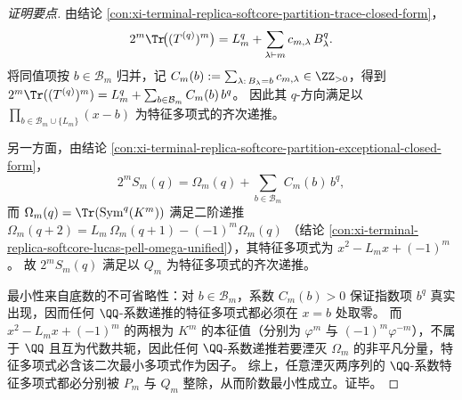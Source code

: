 \begin{proof}[证明要点]
由结论 \ref{con:xi-terminal-replica-softcore-partition-trace-closed-form}，
\[
2^m\Tr\!\bigl((T^{(q)})^m\bigr)=L_m^{q}+\sum_{\lambda\vdash m}c_{m,\lambda}\,B_\lambda^{q}.
\]
将同值项按 \(b\in\mathcal B_m\) 归并，记
\(
C_m(b):=\sum_{\lambda:\,B_\lambda=b}c_{m,\lambda}\in\ZZ_{>0}
\)，得到
\(
2^m\Tr((T^{(q)})^m)=L_m^q+\sum_{b\in\mathcal B_m}C_m(b)\,b^q
\)。
因此其 \(q\)-方向满足以 \(\prod_{b\in\mathcal B_m\cup\{L_m\}}(x-b)\) 为特征多项式的齐次递推。
\par
另一方面，由结论 \ref{con:xi-terminal-replica-softcore-partition-exceptional-closed-form}，
\[
2^mS_m(q)=\Omega_m(q)+\sum_{b\in\mathcal B_m}C_m(b)\,b^q,
\]
而 \(\Omega_m(q)=\Tr(\mathrm{Sym}^q(K^m))\) 满足二阶递推
\(
\Omega_m(q+2)=L_m\,\Omega_m(q+1)-(-1)^m\Omega_m(q)
\)
（结论 \ref{con:xi-terminal-replica-softcore-lucas-pell-omega-unified}），其特征多项式为 \(x^2-L_m x+(-1)^m\)。
故 \(2^mS_m(q)\) 满足以 \(Q_m\) 为特征多项式的齐次递推。
\par
最小性来自底数的不可省略性：对 \(b\in\mathcal B_m\)，系数 \(C_m(b)>0\) 保证指数项 \(b^q\) 真实出现，因而任何 \(\QQ\)-系数递推的特征多项式都必须在 \(x=b\) 处取零。
而 \(x^2-L_m x+(-1)^m\) 的两根为 \(K^m\) 的本征值（分别为 \(\varphi^m\) 与 \((-1)^m\varphi^{-m}\)），不属于 \(\QQ\) 且互为代数共轭，因此任何 \(\QQ\)-系数递推若要湮灭 \(\Omega_m\) 的非平凡分量，特征多项式必含该二次最小多项式作为因子。
综上，任意湮灭两序列的 \(\QQ\)-系数特征多项式都必分别被 \(P_m\) 与 \(Q_m\) 整除，从而阶数最小性成立。证毕。
\end{proof}

\endinput
